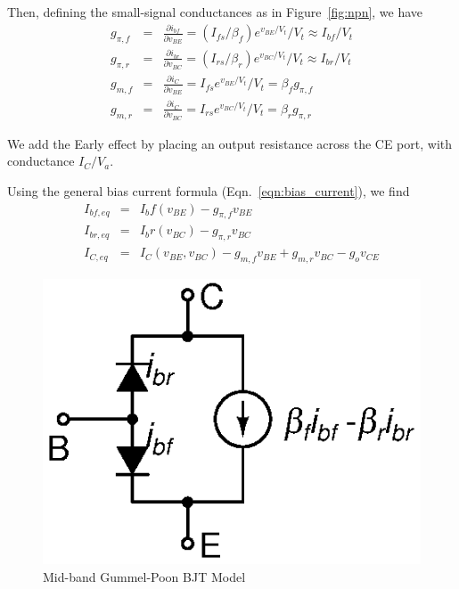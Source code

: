 \documentclass{article}
\begin{document}
Then, defining the small-signal conductances as in Figure~\ref{fig:npn}, we have
\begin{eqnarray}
g_{\pi,f}&=&\frac{\partial i_{bf}}{\partial v_{BE}}=(I_{fs}/\beta_f)e^{v_{BE}/V_t}/V_t \approx I_{bf}/V_t \\
g_{\pi,r}&=&\frac{\partial i_{br}}{\partial v_{BC}}=(I_{rs}/\beta_r)e^{v_{BC}/V_t}/V_t \approx I_{br}/V_t \\
g_{m,f}&=&\frac{\partial i_C}{\partial v_{BE}}=I_{fs}e^{v_{BE}/V_t}/V_t=\beta_fg_{\pi,f} \\
g_{m,r}&=&\frac{\partial i_C}{\partial v_{BC}}=I_{rs}e^{v_{BC}/V_t}/V_t=\beta_rg_{\pi,r}
\end{eqnarray}

We add the Early effect by placing an output resistance across the CE port, with conductance $I_C/V_a$.

Using the general bias current formula (Eqn.~\ref{eqn:bias_current}), we find
\begin{eqnarray}
I_{bf,eq}&=&I_bf(v_{BE})-g_{\pi,f}v_{BE} \\
I_{br,eq}&=&I_br(v_{BC})-g_{\pi,r}v_{BC} \\
I_{C,eq}&=&I_C(v_{BE},v_{BC})-g_{m,f}v_{BE}+g_{m,r}v_{BC}-g_ov_{CE}
\end{eqnarray}

\begin{figure}[h]
\begin{center}
\includegraphics{fig/gummel-poon.eps}
\caption{Mid-band Gummel-Poon BJT Model \label{fig:gummel-poon}}
\end{center}
\end{figure}
\end{document}

